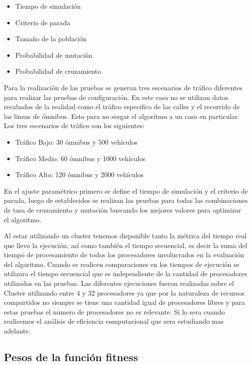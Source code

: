 \begin{itemize}
	\item Tiempo de simulación	
	\item Criterio de parada
	\item Tamaño de la población
	\item Probabilidad de mutación
	\item Probabilidad de cruzamiento
\end{itemize}

Para la realización de las pruebas se generan tres escenarios de tráfico diferentes para realizar las pruebas de configuración. En este caso no se utilizan datos recabados de la realidad como el tráfico especifico de las calles y el recorrido de las lineas de ómnibus. Esto para no sesgar el algoritmo a un caso en particular.
Los tres escenarios de tráfico son los siguientes:

\begin{itemize}
	\item Tráfico Bajo: 30 ómnibus y 500 vehículos	
	\item Tráfico Medio: 60 ómnibus y 1000 vehículos
	\item Tráfico Alto: 120 ómnibus y 2000 vehículos
\end{itemize}


En el ajuste paramétrico primero se define el tiempo de simulación y el criterio de parada, luego de establecidos se realizan las pruebas para todas las combinaciones de tasa de cruzamiento y mutación buscando los mejores valores para optimizar el algoritmo.

Al estar utilizando un cluster tenemos disponible tanto la métrica del tiempo real que llevo la ejecución, así como también el tiempo secuencial, es decir la suma del tiempo de procesamiento de todos los procesadores involucrados en la evaluación del algoritmo. 
Cuando se realicen comparaciones en los tiempos de ejecución se utilizara el tiempo secuencial que es independiente de la cantidad de procesadores utilizados en las pruebas. Las diferentes ejecuciones fueron realizadas sobre el Cluster utilizando entre 4 y 32 procesadores ya que por la naturaleza de recursos compartidos no siempre se tiene una cantidad igual  de procesadores libres y para estas pruebas el numero de procesadores no es relevante. Si lo sera cuando realicemos el análisis de eficiencia computacional que sera estudiando mas adelante.



\subsection{Pesos de la función fitness}

